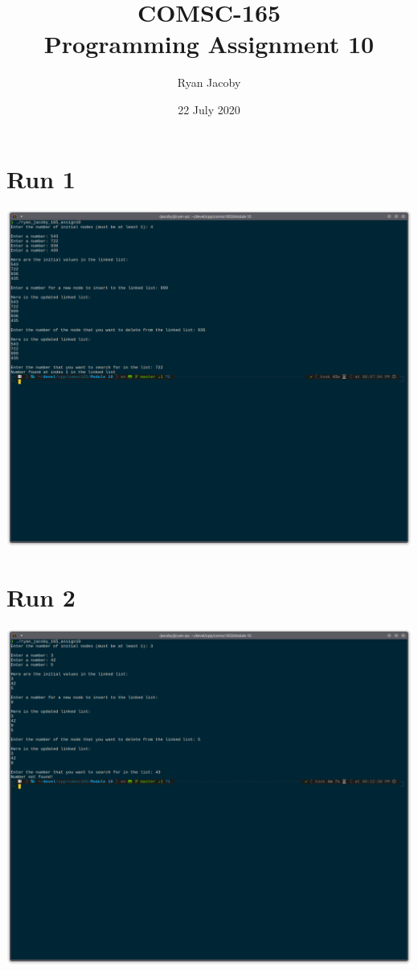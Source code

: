 \documentclass[letterpaper, 11pt]{article}
\title{COMSC-165 \\ Programming Assignment 10}
\author{Ryan Jacoby}
\date{22 July 2020}
\begin{document}
\maketitle

\section*{Run 1}
\includegraphics[scale=0.5]{run1.png} 

\section*{Run 2}
\includegraphics[scale=0.5]{run2.png}
\end{document}

